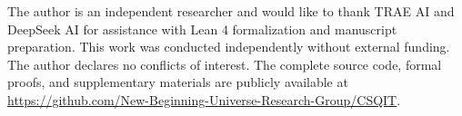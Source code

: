 \documentclass[aps,prd,twocolumn,nofootinbib,floatfix]{revtex4-2}
\begin{document}
\acknowledgments

The author is an independent researcher and would like to thank TRAE AI and DeepSeek AI for assistance with Lean 4 formalization and manuscript preparation. This work was conducted independently without external funding. The author declares no conflicts of interest. The complete source code, formal proofs, and supplementary materials are publicly available at \url{https://github.com/New-Beginning-Universe-Research-Group/CSQIT}.


\end{document}
